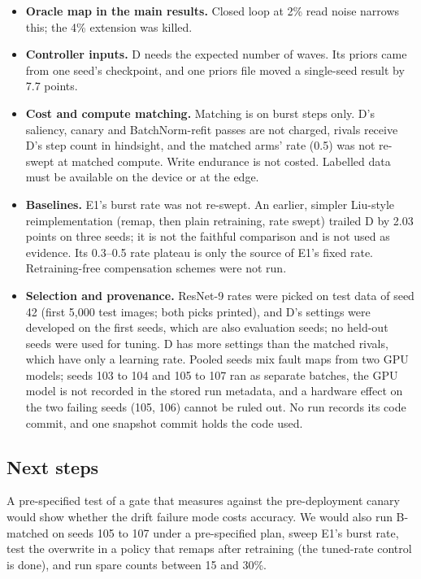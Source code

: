 \documentclass[journal]{IEEEtran}
\begin{document}
\begin{itemize}
D trails retraining-only in S4 (negative with 5\% spares, mixed with 15\%), and the cause is an untested hypothesis.
\item \textbf{Oracle map in the main results.}
Closed loop at 2\% read noise narrows this; the 4\% extension was killed.
\item \textbf{Controller inputs.}
D needs the expected number of waves.
Its priors came from one seed's checkpoint, and one priors file moved a single-seed result by 7.7 points.
\item \textbf{Cost and compute matching.}
Matching is on burst steps only. D's saliency, canary and BatchNorm-refit passes are not charged, rivals receive D's step count in hindsight, and the matched arms' rate (0.5) was not re-swept at matched compute.
Write endurance is not costed.
Labelled data must be available on the device or at the edge.
\item \textbf{Baselines.}
E1's burst rate was not re-swept.
An earlier, simpler Liu-style reimplementation (remap, then plain retraining, rate swept) trailed D by 2.03 points on three seeds; it is not the faithful comparison and is not used as evidence. Its 0.3--0.5 rate plateau is only the source of E1's fixed rate.
Retraining-free compensation schemes were not run.
\item \textbf{Selection and provenance.}
ResNet-9 rates were picked on test data of seed 42 (first 5,000 test images; both picks printed), and D's settings were developed on the first seeds, which are also evaluation seeds; no held-out seeds were used for tuning.
D has more settings than the matched rivals, which have only a learning rate.
Pooled seeds mix fault maps from two GPU models; seeds 103 to 104 and 105 to 107 ran as separate batches, the GPU model is not recorded in the stored run metadata, and a hardware effect on the two failing seeds (105, 106) cannot be ruled out.
No run records its code commit, and one snapshot commit holds the code used.
\end{itemize}

\subsection{Next steps}
A pre-specified test of a gate that measures against the pre-deployment canary would show whether the drift failure mode costs accuracy.
We would also run B-matched on seeds 105 to 107 under a pre-specified plan, sweep E1's burst rate, test the overwrite in a policy that remaps after retraining (the tuned-rate control is done), and run spare counts between 15 and 30\%.
\end{document}
